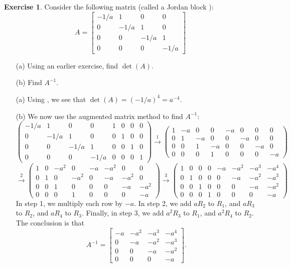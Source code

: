 \documentclass[a4paper]{book}
\newcommand{\bbm}       {\begin{bmatrix}}
\newcommand{\ebm}       {\end{bmatrix}}
\newcommand{\xra}       {\xrightarrow}
\renewcommand{\:}{\colon}
\newcommand{\mathworld}[1]{}
\theoremstyle{definition}
\newtheorem{exercise}[theorem]{Exercise}
\renewenvironment{solution}{\SolutionInline}{\endSolutionInline}
\begin{document}
\begin{exercise}
 Consider the following matrix (called a Jordan block \mathworld{JordanBlock}):
 \[ A = \bbm
          -1/a & 1    & 0    & 0   \\
          0    & -1/a & 1    & 0   \\
          0    & 0    & -1/a & 1   \\
          0    & 0    & 0    & -1/a
        \ebm
 \]
 \begin{itemize}
  \item[(a)] Using an earlier exercise, find $\det(A)$.
  \item[(b)] Find $A^{-1}$.
 \end{itemize}
\end{exercise}
\begin{solution}
 \begin{itemize}
  \item[(a)] Using , we see that
   $\det(A)=(-1/a)^4=a^{-4}$.
  \item[(b)] We now use the augmented matrix method to find $A^{-1}$:
  {\tiny \[
   \left(\begin{array}{cccc|cccc}
     -1/a&1&0&0 &1&0&0&0 \\
     0&-1/a&1&0 &0&1&0&0 \\
     0&0&-1/a&1 &0&0&1&0 \\
     0&0&0&-1/a &0&0&0&1
   \end{array}\right) \xra{1}
   \left(\begin{array}{cccc|cccc}
     1&-a&0&0 &-a&0&0&0 \\
     0&1&-a&0 &0&-a&0&0 \\
     0&0&1&-a &0&0&-a&0 \\
     0&0&0&1  &0&0&0&-a
   \end{array}\right) \] \[ \xra{2}
   \left(\begin{array}{cccc|cccc}
     1&0&-a^2&0 &-a&-a^2&0&0 \\
     0&1&0&-a^2 &0&-a&-a^2&0 \\
     0&0&1&0    &0&0&-a&-a^2 \\
     0&0&0&1    &0&0&0&-a
   \end{array}\right)  \xra{3}
   \left(\begin{array}{cccc|cccc}
     1&0&0&0 &-a&-a^2&-a^3&-a^4 \\
     0&1&0&0 &0&-a&-a^2&-a^3 \\
     0&0&1&0 &0&0&-a&-a^2 \\
     0&0&0&1 &0&0&0&-a
   \end{array}\right)
  \]}
  In step 1, we multiply each row by $-a$.  In step 2, we add $aR_2$
  to $R_1$, and $aR_3$ to $R_2$, and $aR_4$ to $R_3$.  Finally, in
  step 3, we add $a^2R_3$ to $R_1$, and $a^2R_4$ to $R_2$.  The
  conclusion is that
  \[ A^{-1} = \bbm
               -a&-a^2&-a^3&-a^4 \\
               0&-a&-a^2&-a^3 \\
               0&0&-a&-a^2 \\
               0&0&0&-a
              \ebm.
  \]
 \end{itemize}
\end{solution}
\end{document}
